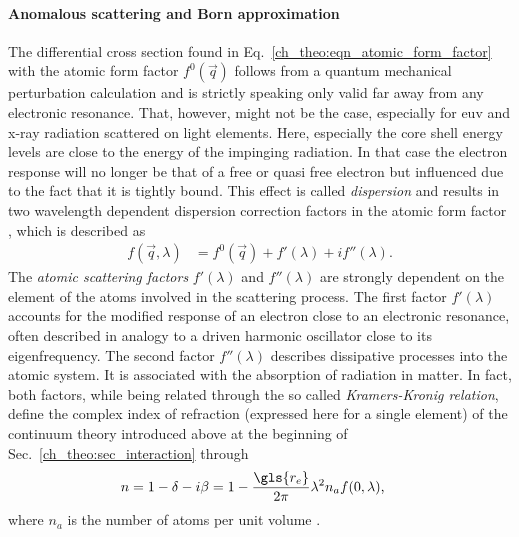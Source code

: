 \paragraph{Anomalous scattering and Born approximation}
The differential cross section found in Eq.~\eqref{ch_theo:eqn_atomic_form_factor} with the atomic form factor $f^{0}(\vec{q})$ follows from a quantum mechanical perturbation calculation and is strictly speaking only valid far away from any electronic resonance. That, however, might not be the case, especially for \gls{euv} and x-ray radiation scattered on light elements. Here, especially the core shell energy levels are close to the energy of the impinging radiation. In that case the electron response will no longer be that of a free or quasi free electron but influenced due to the fact that it is tightly bound. This effect is called \emph{dispersion} and results in two wavelength dependent dispersion correction factors in the atomic form factor \cite{als-nielsen_x-rays_2011, daillant_x-ray_2009}, which is described as
\begin{align}
 f(\vec{q}, \lambda) &= f^0(\vec{q}) + f'(\lambda) + i f''(\lambda) \text{.} \label{ch_theo:eqn_dispersion_correction}
\end{align}
The \emph{atomic scattering factors} $f'(\lambda)$ and $f''(\lambda)$ are strongly dependent on the element of the atoms involved in the scattering process. The first factor $f'(\lambda)$ accounts for the modified response of an electron close to an electronic resonance, often described in analogy to a driven harmonic oscillator close to its eigenfrequency. The second factor $f''(\lambda)$ describes dissipative processes into the atomic system. It is associated with the absorption of radiation in matter. In fact, both factors, while being related through the so called \emph{Kramers-Kronig relation}, define the complex index of refraction (expressed here for a single element) of the continuum theory introduced above at the beginning of Sec.~\ref{ch_theo:sec_interaction} through
\begin{align}
n &= 1 - \delta - i \beta = 1 - \frac{\gls{r_e}}{2 \pi} \lambda^2 n_a f(0, \lambda) \text{,}
\end{align}
where $n_a$ is the number of atoms per unit volume \cite{thompson_x-ray_2001}.


